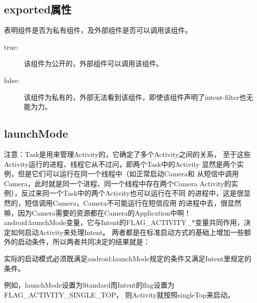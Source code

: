 \subsection[exported属性]{exported属性}
表明组件是否为私有组件，及外部组件是否可以调用该组件。
\begin{description}
  \item[true:] 该组件为公开的，外部组件可以调用该组件。
  \item[false:] 该组件为私有的，外部无法看到该组件，即使该组件声明了intent-filter也无能为力。
\end{description}


\subsection[launchMode]{launchMode}
注意：Task是用来管理Activity的，它确定了多个Activity之间的关系，
至于这些Activity运行的进程、线程它从不过问，即两个Task中的Activity
显然是两个实例，但是它们可以运行在同一个线程中（如正常启动Camera和
从短信中调用Camera，此时就是同一个进程、同一个线程中存在两个Camera
Activity的实例），反过来同一个Task中的两个Activity也可以运行在不同
的进程中，这是很显然的，短信调用Camera，Camera不可能运行在短信应用
的进程中去，很显然嘛，因为Camera需要的资源都在Camera的Application中啊！
\vspace{1em}
android:launchMode变量，它与Intent的FLAG\_ACTIVITY\_*变量共同作用，决定如何启动Activity来处理Intent。
两者都是在标准启动方式的基础上增加一些额外的启动条件，所以两者共同决定的结果就是：

实际的启动模式必须既满足android:launchMode规定的条件又满足Intent里规定的条件。

例如，launchMode设置为Standard而Intent的flag设置为FLAG\_ACTIVITY\_SINGLE\_TOP，
则Activity就按照singleTop来启动。


